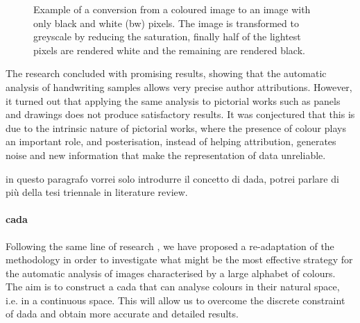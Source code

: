\begin{figure}[ht]
\begin{subfigure}{0.4\linewidth}
	\end{subfigure}
	\caption[BW transformation]{Example of a conversion from a coloured image to an image with only black and white (bw) pixels. The image is transformed to greyscale by reducing the saturation, finally half of the lightest pixels are rendered white and the remaining are rendered black.}
	\label{fig:example_bw}
\end{figure}

\noindent The research concluded with promising results, showing that the automatic analysis of handwriting samples allows very precise author attributions. However, it turned out that applying the same analysis to pictorial works such as panels and drawings does not produce satisfactory results. It was conjectured that this is due to the intrinsic nature of pictorial works, where the presence of colour plays an important role, and posterisation, instead of helping attribution, generates noise and new information that make the representation of data unreliable.

\begin{note} in questo paragrafo vorrei solo introdurre il concetto di \gls{dada}, potrei parlare di più della tesi triennale in literature review. \end{note}

\paragraph{\gls{cada}}
Following the same line of research \cite[my bachelor thesis]{thesis}, we have proposed a re-adaptation of the methodology in order to investigate what might be the most effective strategy for the automatic analysis of images characterised by a large alphabet of colours. The aim is to construct a \gls{cada} that can analyse colours in their natural space, i.e. in a continuous space. This will allow us to overcome the discrete constraint of \gls{dada} and obtain more accurate and detailed results.

